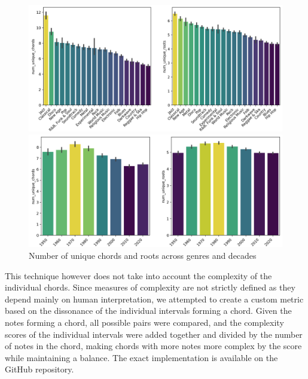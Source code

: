 \documentclass{article}
\begin{document}
\begin{figure}[!htbp]
    \centering
    \begin{minipage}{\textwidth}
        \centering
        \includegraphics[width=\linewidth]{images/chords-across-genres.png}
    \end{minipage}\hfill
    \begin{minipage}{\textwidth}
        \centering
        \includegraphics[width=\linewidth]{images/chords-across-decades.png}
    \end{minipage}
    \caption{Number of unique chords and roots across genres and decades}
    \label{fig:num-unique-chords-roots-genres-decades}
\end{figure}

This technique however does not take into account the complexity of the individual chords. Since measures of complexity are not strictly defined as they depend mainly on human interpretation, we attempted to create a custom metric based on the dissonance of the individual intervals forming a chord. Given the notes forming a chord, all possible pairs were compared, and the complexity scores of the individual intervals were added together and divided by the number of notes in the chord, making chords with more notes more complex by the score while maintaining a balance. The exact implementation is available on the GitHub repository.
\end{document}
